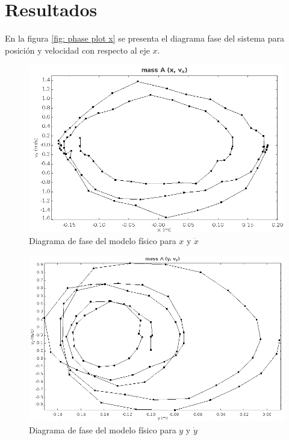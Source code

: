 \section{Resultados}
En la figura \ref{fig: phase plot x} 
se presenta el diagrama fase del sistema para
posición y velocidad con respecto al eje $x$.




\begin{figure}[h]
 \centering
 \includegraphics[scale=0.3]{./img/tracker_poc_phasediagram_x_vx.png}
 \caption{Diagrama de fase del modelo físico para $x$ y $\dot{x}$}
 \label{fig: tracker phase diagram x vx}
\end{figure}

\begin{figure}[h]
 \centering
 \includegraphics[scale=0.3]{./img/tracker_poc_phasediagram_y_vy.png}
 \caption{Diagrama de fase del modelo físico para $y$ y $\dot{y}$}
 \label{fig: tracker phase diagram y vy}
\end{figure}


